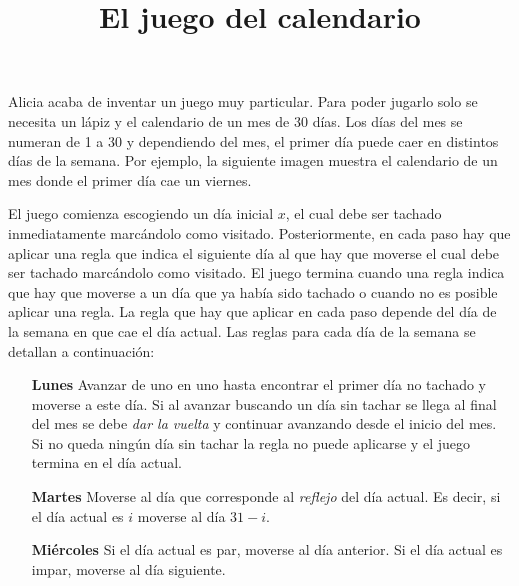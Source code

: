 \documentclass{oci}
\title{El juego del calendario}
\begin{document}
\begin{problemDescription}
  Alicia acaba de inventar un juego muy particular.
  Para poder jugarlo solo se necesita un lápiz y el calendario de un mes de 30 días.
  Los días del mes se numeran de 1 a 30 y dependiendo del mes, el primer día puede caer
  en distintos días de la semana.
  Por ejemplo, la siguiente imagen muestra el calendario de un mes donde el primer día cae un viernes.
  \begin{center}
  \end{center}

  El juego comienza escogiendo un día inicial $x$, el cual debe ser tachado inmediatamente
  marcándolo como visitado.
  Posteriormente, en cada paso hay que aplicar una regla que indica el siguiente día al que hay
  que moverse el cual debe ser tachado marcándolo como visitado.
  El juego termina cuando una regla indica que hay que moverse a un día que ya había sido tachado
  o cuando no es posible aplicar una regla.
  La regla que hay que aplicar en cada paso depende del día de la semana en que cae el día actual.
  Las reglas para cada día de la semana se detallan a continuación:
  \begin{itemize}
   \item[\bf Lunes] Avanzar de uno en uno hasta encontrar el primer día no tachado y moverse a este día.
    Si al avanzar buscando un día sin tachar se llega al final del mes se debe \emph{dar la vuelta} y
    continuar avanzando desde el inicio del mes.
    Si no queda ningún día sin tachar la regla no puede aplicarse y el juego termina en el día actual.

    \item[\bf Martes] Moverse al día que corresponde al \emph{reflejo} del día actual.
    Es decir, si el día actual es $i$ moverse al día $31 - i$.

    \item[\bf Miércoles] Si el día actual es par, moverse al día anterior.
    Si el día actual es impar, moverse al día siguiente.


\end{itemize}
\end{problemDescription}
\end{document}
